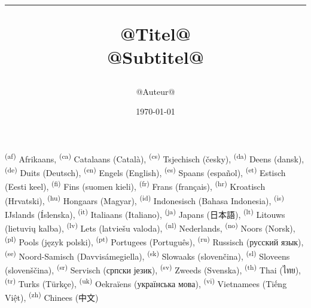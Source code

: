 \documentclass[onecolumn,a4paper,10pt]{report}
\begin{document}
\sffamily
\raggedbottom
\title{\color{kleur}\bfseries\Huge \begin{shaded*} \hrule @Titel@ %
\\[1ex] \large @Subtitel@ %
\end{shaded*}}
\author{\color{kleur}@Auteur@}
\vfill
\date{\color{kleur}\today{}}

\maketitle

\setcounter{page}{1}

\tableofcontents
\newpage
\setcounter{page}{1}
\textsuperscript{(af)}  Afrikaans,
\textsuperscript{(ca)} Catalaans (Català),
\textsuperscript{(cs)}  Tsjechisch (česky),
\textsuperscript{(da)}  Deens (dansk),
\textsuperscript{(de)}  Duits (Deutsch),
\textsuperscript{(en)}  Engels (English),
\textsuperscript{(es)}  Spaans (español),
\textsuperscript{(et)}  Estisch (Eesti keel),
\textsuperscript{(fi)}  Fins (suomen kieli),
\textsuperscript{(fr)}  Frans (français),
\textsuperscript{(hr)}  Kroatisch (Hrvatski),
\textsuperscript{(hu)}  Hongaars (Magyar),
\textsuperscript{(id)}  Indonesisch (Bahasa Indonesia),
\textsuperscript{(is)}  IJslands (Íslenska),
\textsuperscript{(it)}  Italiaans (Italiano),
\textsuperscript{(ja)}  Japans (日本語),
\textsuperscript{(lt)}  Litouws (lietuvių kalba),
\textsuperscript{(lv)}  Lets (latviešu valoda),
\textsuperscript{(nl)}  Nederlands,
\textsuperscript{(no)}  Noors (Norsk),
\textsuperscript{(pl)}  Pools (język polski),
\textsuperscript{(pt)}  Portugees (Português),
\textsuperscript{(ru)}  Russisch (русский язык),
\textsuperscript{(se)} Noord-Samisch (Davvisámegiella),
\textsuperscript{(sk)}  Slowaaks (slovenčina),
\textsuperscript{(sl)}  Sloveens (slovenščina),
\textsuperscript{(sr)}  Servisch (српски језик),
\textsuperscript{(sv)}  Zweeds (Svenska),
\textsuperscript{(th)}  Thai (ไทย),
\textsuperscript{(tr)}  Turks (Türkçe),
\textsuperscript{(uk)}  Oekraïens (українська мова),
\textsuperscript{(vi)}  Vietnamees (Tiếng Việt),
\textsuperscript{(zh)}  Chinees (中文)

\newpage

\end{document}
